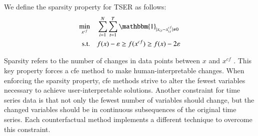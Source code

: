 \begin{definition}
We define the sparsity property for TSER as follows:
\begin{equation}
\begin{aligned}
\min_{x^{cf}} \quad & \sum_{i=1}^{N} \sum_{t=1}^{T} \mathbbm{1}_{|x_{i, t}-x_{i, t}^{c f}| \neq 0}\\
\mathrm{s.t.} \quad & \valid{x}{x^{c f}}\\
\end{aligned}
\end{equation}
\label{def:sparsity}
\end{definition}
Sparsity refers to the number of changes in data points between $x$ and $x^{c f}$ \cite{mothilal_explaining_2020}. This key property forces a \gls{cfe} method to make human-interpretable changes.
When enforcing the sparsity property, \gls{cfe} methods strive to alter the fewest variables necessary to achieve user-interpretable solutions.
Another constraint for time series data is that not only the fewest number of variables should change, but the changed variables should be in continuous subsequences of the original time series. Each counterfactual method implements a different technique to overcome this constraint.


